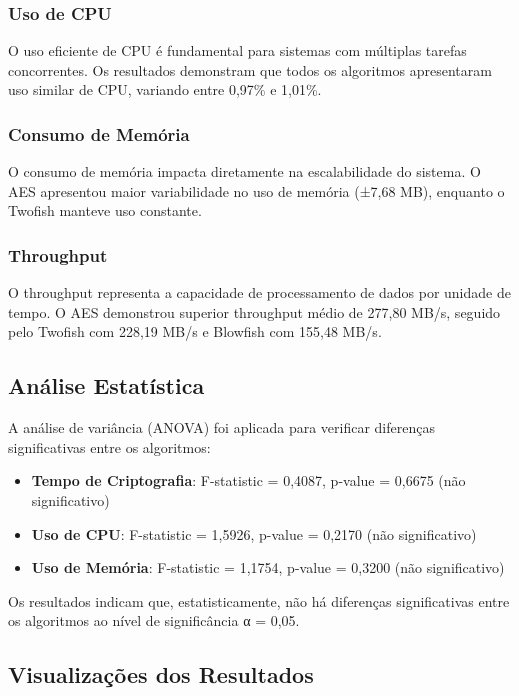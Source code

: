 \documentclass[12pt,a4paper,oneside]{article}
\begin{document}
\subsubsection{Uso de CPU}

O uso eficiente de CPU é fundamental para sistemas com múltiplas tarefas concorrentes. Os resultados demonstram que todos os algoritmos apresentaram uso similar de CPU, variando entre 0,97\% e 1,01\%.

\subsubsection{Consumo de Memória}

O consumo de memória impacta diretamente na escalabilidade do sistema. O AES apresentou maior variabilidade no uso de memória (±7,68 MB), enquanto o Twofish manteve uso constante.

\subsubsection{Throughput}

O throughput representa a capacidade de processamento de dados por unidade de tempo. O AES demonstrou superior throughput médio de 277,80 MB/s, seguido pelo Twofish com 228,19 MB/s e Blowfish com 155,48 MB/s.

\subsection{Análise Estatística}

A análise de variância (ANOVA) foi aplicada para verificar diferenças significativas entre os algoritmos:

\begin{itemize}
    \item \textbf{Tempo de Criptografia}: F-statistic = 0,4087, p-value = 0,6675 (não significativo)
    \item \textbf{Uso de CPU}: F-statistic = 1,5926, p-value = 0,2170 (não significativo)
    \item \textbf{Uso de Memória}: F-statistic = 1,1754, p-value = 0,3200 (não significativo)
\end{itemize}

Os resultados indicam que, estatisticamente, não há diferenças significativas entre os algoritmos ao nível de significância α = 0,05.

\subsection{Visualizações dos Resultados}
\end{document}

